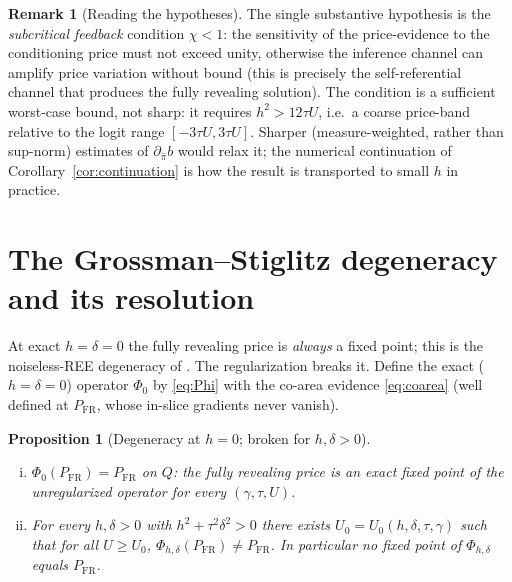 \documentclass[11pt]{article}
\newtheorem{proposition}{Proposition}
\theoremstyle{definition}
\newtheorem{remark}{Remark}
\begin{document}
\begin{remark}[Reading the hypotheses]
The single substantive hypothesis is the \emph{subcritical feedback}
condition $\chi<1$: the sensitivity of the price-evidence to the
conditioning price must not exceed unity, otherwise the inference channel
can amplify price variation without bound (this is precisely the
self-referential channel that produces the fully revealing solution). The
condition is a sufficient worst-case bound, not sharp: it requires
$h^2>12\tau U$, i.e.\ a coarse price-band relative to the logit range
$[-3\tau U,3\tau U]$. Sharper (measure-weighted, rather than sup-norm)
estimates of $\partial_{\hat\pi}b$ would relax it; the numerical
continuation of Corollary~\ref{cor:continuation} is how the result is
transported to small $h$ in practice.
\end{remark}

\section{The Grossman--Stiglitz degeneracy and its resolution}
\label{sec:GS}

At exact $h=\delta=0$ the fully revealing price is \emph{always} a fixed
point; this is the noiseless-REE degeneracy of
\cite{GrossmanStiglitz,Hellwig,Radner}. The regularization breaks it.
Define the exact ($h=\delta=0$) operator $\Phi_0$ by \eqref{eq:Phi} with the
co-area evidence \eqref{eq:coarea} (well defined at
$P_{\mathrm{FR}}$, whose in-slice gradients never vanish).

\begin{proposition}[Degeneracy at $h=0$; broken for $h,\delta>0$]
\label{prop:GS}
\begin{enumerate}[(i)]
\item $\Phi_0(P_{\mathrm{FR}})=P_{\mathrm{FR}}$ on $Q$: the fully revealing
price is an exact fixed point of the unregularized operator for every
$(\gamma,\tau,U)$.
\item For every $h,\delta>0$ with $h^2+\tau^2\delta^2>0$ there exists
$U_0=U_0(h,\delta,\tau,\gamma)$ such that for all $U\ge U_0$,
$\Phi_{h,\delta}(P_{\mathrm{FR}})\neq P_{\mathrm{FR}}$. In particular no
fixed point of $\Phi_{h,\delta}$ equals $P_{\mathrm{FR}}$.
\end{enumerate}
\end{proposition}
\end{document}
